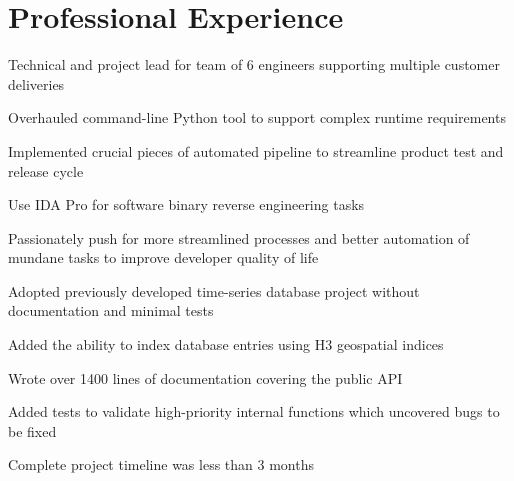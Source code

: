 \documentclass[letterpaper]{deedy-resume}
\newcommand{\experiencespace}{\vspace{2em}}
\begin{document}
\begin{minipage}[t]{0.66\textwidth} %

    \section{Professional Experience}
    \begin{compactitem}
        \item Technical and project lead for team of 6 engineers supporting multiple customer deliveries
        \item Overhauled command-line Python tool to support complex runtime requirements
        \item Implemented crucial pieces of automated pipeline to streamline product test and release cycle
        \item Use IDA Pro for software binary reverse engineering tasks
        \item Passionately push for more streamlined processes and better automation of mundane tasks to
            improve developer quality of life
    \end{compactitem}
    \experiencespace

    \begin{compactitem}
        \item Adopted previously developed time-series database project without documentation and minimal tests
        \item Added the ability to index database entries using H3 geospatial indices
        \item Wrote over 1400 lines of documentation covering the public API
        \item Added tests to validate high-priority internal functions which uncovered bugs to be fixed
        \item Complete project timeline was less than 3 months
    \end{compactitem}
    \experiencespace


\end{minipage}
\end{document}
